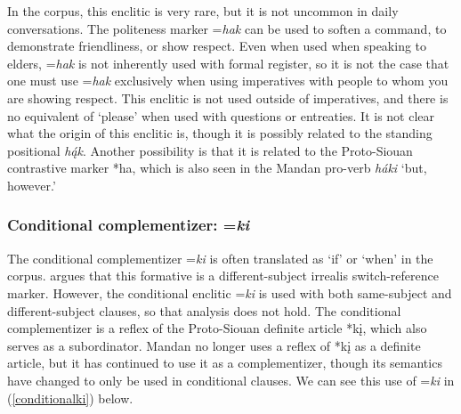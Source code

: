 In the corpus, this enclitic is very rare, but it is not uncommon in daily conversations. The politeness marker =\textit{hak} can be used to soften a command, to demonstrate friendliness, or show respect. Even when used when speaking to elders, =\textit{hak} is not inherently used with formal register, so it is not the case that one must use =\textit{hak} exclusively when using imperatives with people to whom you are showing respect. This enclitic is not used outside of imperatives, and there is no equivalent of `please' when used with questions or entreaties. It is not clear what the origin of this enclitic is, though it is possibly related to the standing positional \textit{hą́k}. Another possibility is that it is related to the Proto-Siouan contrastive marker *ha, which is also seen in the Mandan pro-verb \textit{háki} `but, however.'

\subsubsection{Conditional complementizer: =\textit{ki}}

The conditional complementizer =\textit{ki} is often translated as `if' or `when' in the corpus. \citet{mixco1997a,mixco1997b} argues that this formative is a different-subject irrealis switch-reference marker. However, the conditional enclitic =\textit{ki} is used with both same-subject and different-subject clauses, so that analysis does not hold. The conditional complementizer is a reflex of the Proto-Siouan definite article *kį, which also serves as a subordinator. Mandan no longer uses a reflex of *kį as a definite article, but it has continued to use it as a complementizer, though its semantics have changed to only be used in conditional clauses. We can see this use of =\textit{ki} in (\ref{conditionalki}) below.

